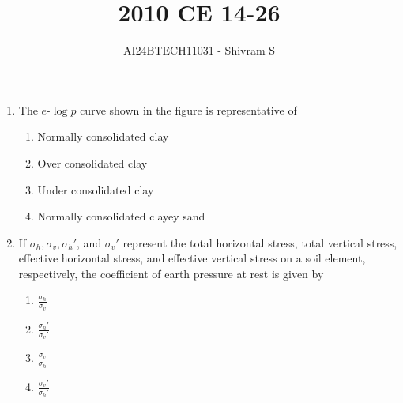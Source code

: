 \documentclass[journal]{IEEEtran}
\begin{document}

\onecolumn

\title{2010 CE 14-26}
\author{AI24BTECH11031 - Shivram S}
\maketitle
\bigskip

\renewcommand{\thefigure}{\theenumi}
\renewcommand{\thetable}{\theenumi}

\begin{enumerate}
    \item The $e$-$\log p$ curve shown in the figure is representative of 
   
        \begin{center}
        \end{center}

        \begin{multicols}{2}
            \begin{enumerate}
                \item Normally consolidated clay
                \item Over consolidated clay
                \item Under consolidated clay
                \item Normally consolidated clayey sand
            \end{enumerate}
        \end{multicols}

    \item If $\sigma_h, \sigma_v, \sigma_h'$, and $\sigma_v'$ represent the total horizontal stress,
    total vertical stress, effective horizontal stress, and effective vertical stress on a soil
    element, respectively, the coefficient of earth pressure at rest is given by  

        \begin{multicols}{4}
            \begin{enumerate}
                \item $\frac{\sigma_h}{\sigma_v}$
                \item $\frac{\sigma_h'}{\sigma_v'}$
                \item $\frac{\sigma_v}{\sigma_h}$
                \item $\frac{\sigma_v'}{\sigma_h'}$
            \end{enumerate}
        \end{multicols}


\end{enumerate}
\end{document}
